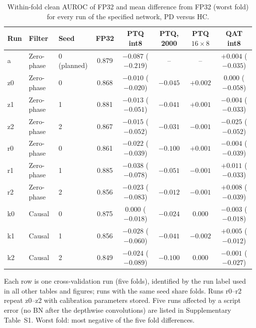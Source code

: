 \documentclass[preprint,12pt]{elsarticle}
\begin{document}
\begin{table}[!t]
\caption{Within-fold clean AUROC of FP32 and mean difference from FP32 (worst fold) for every run of the specified network, PD versus HC.}
\label{tab:runs}
\centering\scriptsize
\setlength{\tabcolsep}{2pt}
\begin{tabular*}{\linewidth}{@{\extracolsep{\fill}}lllccccc@{}}
\toprule
Run & Filter & Seed & FP32 & PTQ int8 & PTQ, 2000 & PTQ $16\times8$ & QAT int8 \\
\midrule
a & Zero-phase & 0 (planned) & 0.879 & $-0.087$ ($-0.219$) & -- & -- & $+0.004$ ($-0.035$) \\
z0 & Zero-phase & 0 & 0.868 & $-0.010$ ($-0.020$) & $-0.045$ & $+0.002$ & $0.000$ ($-0.058$) \\
z1 & Zero-phase & 1 & 0.881 & $-0.013$ ($-0.051$) & $-0.041$ & $+0.001$ & $-0.004$ ($-0.033$) \\
z2 & Zero-phase & 2 & 0.867 & $-0.015$ ($-0.052$) & $-0.031$ & $-0.001$ & $-0.025$ ($-0.052$) \\
r0 & Zero-phase & 0 & 0.861 & $-0.022$ ($-0.039$) & $-0.100$ & $+0.001$ & $-0.004$ ($-0.039$) \\
r1 & Zero-phase & 1 & 0.885 & $-0.038$ ($-0.078$) & $-0.051$ & $-0.001$ & $+0.011$ ($-0.033$) \\
r2 & Zero-phase & 2 & 0.856 & $-0.023$ ($-0.083$) & $-0.012$ & $-0.001$ & $+0.008$ ($-0.039$) \\
k0 & Causal & 0 & 0.875 & $0.000$ ($-0.018$) & $-0.024$ & $0.000$ & $-0.003$ ($-0.018$) \\
k1 & Causal & 1 & 0.856 & $-0.028$ ($-0.060$) & $-0.041$ & $-0.002$ & $+0.005$ ($-0.012$) \\
k2 & Causal & 2 & 0.849 & $-0.024$ ($-0.089$) & $-0.100$ & $0.000$ & $-0.001$ ($-0.027$) \\
\bottomrule
\end{tabular*}

\vspace{2pt}\parbox{\linewidth}{\footnotesize Each row is one cross-validation run (five folds), identified by the run label used in all other tables and figures; runs with the same seed share folds. Runs r0--r2 repeat z0--z2 with calibration parameters stored. Five runs affected by a script error (no BN after the depthwise convolutions) are listed in Supplementary Table~S1. Worst fold: most negative of the five fold differences.}
\end{table}
\end{document}
